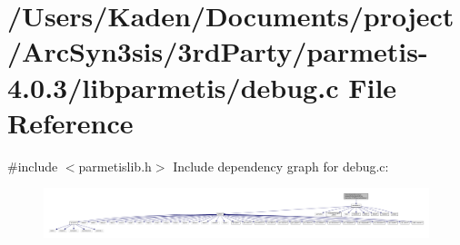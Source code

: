 \hypertarget{a00885}{}\section{/\+Users/\+Kaden/\+Documents/project/\+Arc\+Syn3sis/3rd\+Party/parmetis-\/4.0.3/libparmetis/debug.c File Reference}
\label{a00885}
{\ttfamily \#include $<$parmetislib.\+h$>$}\newline
Include dependency graph for debug.\+c\+:\nopagebreak
\begin{figure}[H]
\begin{center}
\leavevmode
\includegraphics[width=350pt]{a00886}
\end{center}
\end{figure}
